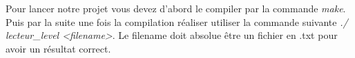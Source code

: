 Pour lancer notre projet vous devez d'abord le compiler par la commande \textit{make}. Puis par la suite une fois la compilation réaliser utiliser la commande suivante \textit{./ lecteur\_level <filename>}. Le filename doit absolue être un fichier en .txt pour avoir un résultat correct.
\newpage